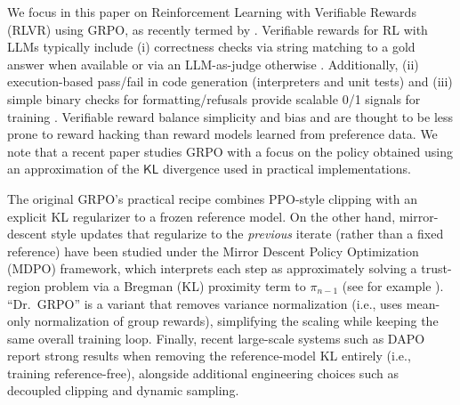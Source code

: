 \documentclass[11pt,reqno]{amsart}
\begin{document}
We focus in this paper on Reinforcement Learning with Verifiable Rewards (RLVR) using GRPO, as recently termed by \citet{lambert2024t}. Verifiable rewards for RL with LLMs typically include (i) correctness checks via string matching to a gold answer when available or via an LLM-as-judge otherwise \citep{guo2025deepseekR1,openr1,deepscaler2025,guan2025deliberativealignmentreasoningenables}. 
Additionally, (ii) execution-based pass/fail in code generation (interpreters and unit tests) and (iii) simple binary checks for formatting/refusals provide scalable 0/1 signals for training \citep{openr1,guo2025deepseekR1,lambert2024t}.
Verifiable reward balance simplicity and  bias and are thought to be less prone to reward hacking  than reward models learned from preference data. %
We note that a recent paper \citep{vojnovic2025alignmentobjectivegrpo} studies GRPO with a focus on the policy obtained using an approximation of the $\mathsf{KL}$  divergence used in practical implementations.

The original GRPO's practical recipe  \citep{shao2024deepseekmath} combines PPO-style clipping with an explicit KL regularizer to a frozen reference model.  On the other hand, mirror-descent style updates that regularize to the \emph{previous} iterate (rather than a fixed reference) have been studied under the Mirror Descent Policy Optimization (MDPO) framework, which interprets each step as approximately solving a trust-region problem via a Bregman (KL) proximity term to $\pi_{n-1}$ (see for example \citep{pmlr-v37-schulman15,tomar2021mirrordescentpolicyoptimization,gunter2024appleintelligencefoundationlanguage}). “Dr.\ GRPO” \citep{liu2025understanding} is a  variant that removes variance normalization (i.e., uses mean-only normalization of group rewards), simplifying the scaling while keeping the same overall training loop. Finally, recent large-scale systems such as DAPO \citep{yu2025dapoopensourcellmreinforcement}  report strong results when removing the reference-model KL entirely (i.e., training reference-free), alongside additional engineering choices such as decoupled clipping and dynamic sampling.%
\end{document}
